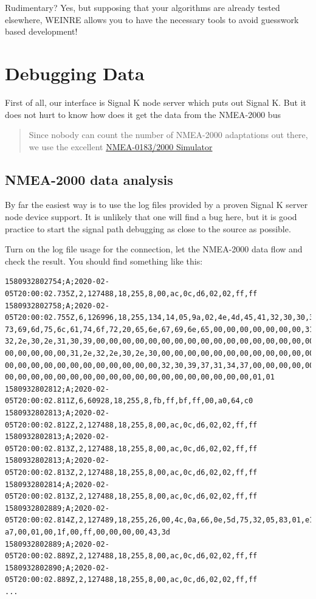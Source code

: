 \documentclass[11pt]{article}
\begin{document}
    Rudimentary? Yes, but supposing that your algorithms are already tested
elsewhere, WEINRE allows you to have the necessary tools to avoid
guesswork based development!

    \hypertarget{debugging-data}{%
\section{Debugging Data}\label{debugging-data}}

    First of all, our interface is Signal K node server which puts out
Signal K. But it does not hurt to know how does it get the data from the
NMEA-2000 bus

    \begin{quote}
Since nobody can count the number of NMEA-2000 adaptations out there, we
use the excellent
\href{https://opencpn.org/wiki/dokuwiki/doku.php?id=opencpn:supplementary_software:signalk:a6\#how_to_use_a_nmea-simulator_to_stream_nmea-0183_and_nmea-2000_data}{NMEA-0183/2000
Simulator}
\end{quote}

    \hypertarget{nmea-2000-data-analysis}{%
\subsection{NMEA-2000 data analysis}\label{nmea-2000-data-analysis}}

    By far the easiest way is to use the log files provided by a proven
Signal K server node device support. It is unlikely that one will find a
bug here, but it is good practice to start the signal path debugging as
close to the source as possible.

    Turn on the log file usage for the connection, let the NMEA-2000 data
flow and check the result. You should find something like this:

    \begin{verbatim}
1580932802754;A;2020-02-05T20:00:02.735Z,2,127488,18,255,8,00,ac,0c,d6,02,02,ff,ff
1580932802758;A;2020-02-05T20:00:02.755Z,6,126996,18,255,134,14,05,9a,02,4e,4d,45,41,32,30,30,30,20,
73,69,6d,75,6c,61,74,6f,72,20,65,6e,67,69,6e,65,00,00,00,00,00,00,00,31,2e,
32,2e,30,2e,31,30,39,00,00,00,00,00,00,00,00,00,00,00,00,00,00,00,00,00,00,
00,00,00,00,00,31,2e,32,2e,30,2e,30,00,00,00,00,00,00,00,00,00,00,00,00,00,
00,00,00,00,00,00,00,00,00,00,00,00,32,30,39,37,31,34,37,00,00,00,00,00,00,
00,00,00,00,00,00,00,00,00,00,00,00,00,00,00,00,00,00,00,01,01
1580932802812;A;2020-02-05T20:00:02.811Z,6,60928,18,255,8,fb,ff,bf,ff,00,a0,64,c0
1580932802813;A;2020-02-05T20:00:02.812Z,2,127488,18,255,8,00,ac,0c,d6,02,02,ff,ff
1580932802813;A;2020-02-05T20:00:02.813Z,2,127488,18,255,8,00,ac,0c,d6,02,02,ff,ff
1580932802813;A;2020-02-05T20:00:02.813Z,2,127488,18,255,8,00,ac,0c,d6,02,02,ff,ff
1580932802814;A;2020-02-05T20:00:02.813Z,2,127488,18,255,8,00,ac,0c,d6,02,02,ff,ff
1580932802889;A;2020-02-05T20:00:02.814Z,2,127489,18,255,26,00,4c,0a,66,0e,5d,75,32,05,83,01,e1,d9,
a7,00,01,00,1f,00,ff,00,00,00,00,43,3d
1580932802889;A;2020-02-05T20:00:02.889Z,2,127488,18,255,8,00,ac,0c,d6,02,02,ff,ff
1580932802890;A;2020-02-05T20:00:02.889Z,2,127488,18,255,8,00,ac,0c,d6,02,02,ff,ff
...
\end{verbatim}
\end{document}
